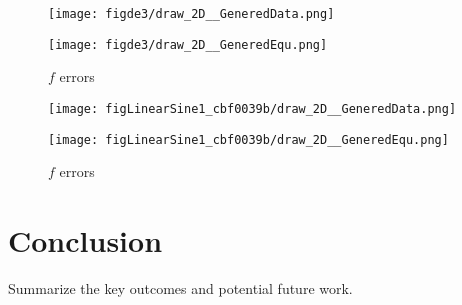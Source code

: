 \documentclass{article}
\begin{document}
\begin{figure}[ht!]
    \centering
    \begin{minipage}{0.45\textwidth}
        \centering
        \texttt{[image: figde3/draw\_2D\_\_GeneredData.png]} %
        \caption{$0.5*sin(x)$}
        \label{fig:fig1}
    \end{minipage}\hfill
    \begin{minipage}{0.45\textwidth}
        \centering
        \texttt{[image: figde3/draw\_2D\_\_GeneredEqu.png]} %
        \caption{$f$ errors}
    \end{minipage}
\end{figure}
\begin{figure}[ht!]
    \centering
    \begin{minipage}{0.45\textwidth}
        \centering
        \texttt{[image: figLinearSine1\_cbf0039b/draw\_2D\_\_GeneredData.png]} %
        \caption{$\frac{\sqrt{2}}{2}*sin(x+\frac{\pi}{4})$}
        \label{fig:fig2}
    \end{minipage}\hfill
    \begin{minipage}{0.45\textwidth}
        \centering
        \texttt{[image: figLinearSine1\_cbf0039b/draw\_2D\_\_GeneredEqu.png]} %
        \caption{$f$ errors}
    \end{minipage}
\end{figure}

\section{Conclusion}
Summarize the key outcomes and potential future work.

\end{document}
